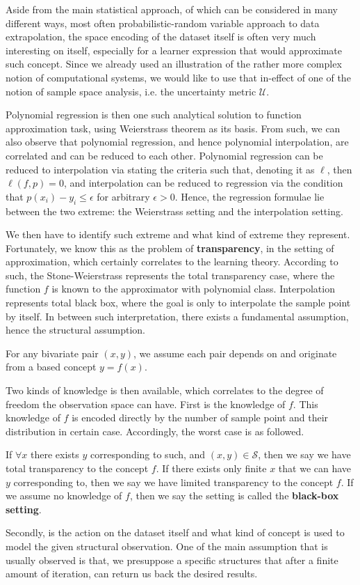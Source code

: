 Aside from the main statistical approach, of which can be considered in many different ways, most often probabilistic-random variable approach to data extrapolation, the space encoding of the dataset itself is often very much interesting on itself, especially for a learner expression that would approximate such concept. Since we already used an illustration of the rather more complex notion of computational systems, we would like to use that in-effect of one of the notion of sample space analysis, i.e. the uncertainty metric $\mathcal{U}$. 

Polynomial regression is then one such analytical solution to function approximation task, using Weierstrass theorem as its basis. From such, we can also observe that polynomial regression, and hence polynomial interpolation, are correlated and can be reduced to each other. Polynomial regression can be reduced to interpolation via stating the criteria such that, denoting it as $\ell$, then $\ell(f,p)=0$, and interpolation can be reduced to regression via the condition that $p(x_{i})-y_{i}\leq \epsilon$ for arbitrary $\epsilon>0$. Hence, the regression formulae lie between the two extreme: the Weierstrass setting and the interpolation setting. 

We then have to identify such extreme and what kind of extreme they represent. Fortunately, we know this as the problem of \textbf{transparency}, in the setting of approximation, which certainly correlates to the learning theory. According to such, the Stone-Weierstrass represents the total transparency case, where the function $f$ is known to the approximator with polynomial class. Interpolation represents total black box, where the goal is only to interpolate the sample point by itself. In between such interpretation, there exists a fundamental assumption, hence the structural assumption. 

\begin{assumption}[Transparency]
    For any bivariate pair $(x,y)$, we assume each pair depends on and originate from a based concept $y=f(x)$. 
\end{assumption}

Two kinds of knowledge is then available, which correlates to the degree of freedom the observation space can have. First is the knowledge of $f$. This knowledge of $f$ is encoded directly by the number of sample point and their distribution in certain case. Accordingly, the worst case is as followed. 

\begin{conjecture}
    If $\forall x$ there exists $y$ corresponding to such, and $(x,y)\in \mathcal{S}$, then we say we have total transparency to the concept $f$. If there exists only finite $x$ that we can have $y$ corresponding to, then we say we have limited transparency to the concept $f$. If we assume no knowledge of $f$, then we say the setting is called the \textbf{black-box setting}. 
\end{conjecture}
Secondly, is the action on the dataset itself and what kind of concept is used to model the given structural observation. One of the main assumption that is usually observed is that, we presuppose a specific structures that after a finite amount of iteration, can return us back the desired results. 

